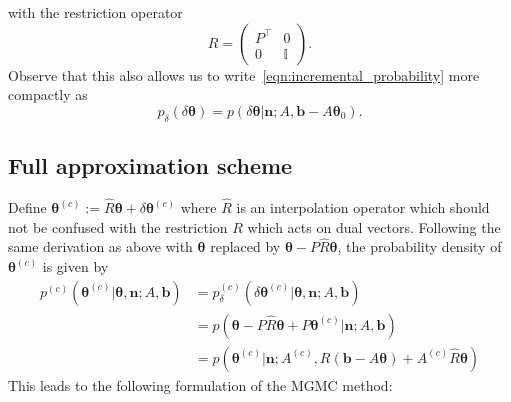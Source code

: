 \documentclass[11pt]{article}
\renewcommand{\vec}[1]{\boldsymbol{#1}}
\begin{document}
with the restriction operator
\begin{equation}
    R = \begin{pmatrix}P^\top & 0 \\ 0 & \mathbb{I}\end{pmatrix}.
\end{equation}
Observe that this also allows us to write~\eqref{eqn:incremental_probability} more compactly as
\begin{equation}
    p_\delta(\delta\vec{\theta}) = p(\delta\vec{\theta}|\vec{n};A,\vec{b}-A\vec{\theta}_0).\label{}
\end{equation}
\subsection{Full approximation scheme}
Define $\vec{\theta}^{(c)} := \hat{R}\vec{\theta} + \delta\vec{\theta}^{(c)}$ where $\hat{R}$ is an interpolation operator which should not be confused with the restriction $R$ which acts on dual vectors. Following the same derivation as above with $\vec{\theta}$ replaced by $\vec{\theta}-P\hat{R}\vec{\theta}$, the probability density of $\vec{\theta}^{(c)}$ is given by
\begin{equation}
    \begin{aligned}
p^{(c)}(\vec{\theta}^{(c)}|\vec{\theta},\vec{n};A,\vec{b}) &= p^{(c)}_\delta(\delta\vec{\theta}^{(c)}|\vec{\theta},\vec{n};A,\vec{b})\\
&= p(\vec{\theta}-P\hat{R}\vec{\theta} + P \vec{\theta}^{(c)}|\vec{n};A,\vec{b})\\
&= p(\vec{\theta}^{(c)}|\vec{n};A^{(c)}, R(\vec{b}-A\vec{\theta})+A^{(c)}\hat{R}\vec{\theta})
    \end{aligned}
\end{equation}
This leads to the following formulation of the MGMC method:
\end{document}
